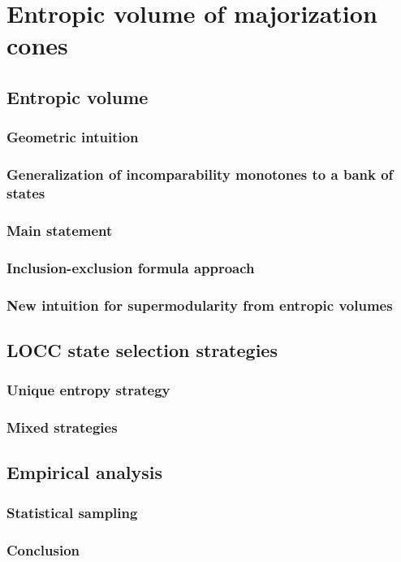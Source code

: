 \chapter{Entropic volume of majorization cones} \label{chap:volume}

\section{Entropic volume}

\subsection{Geometric intuition}

\subsection{Generalization of incomparability monotones to a bank of states}

\subsection{Main statement}

\subsection{Inclusion-exclusion formula approach}

\subsection{New intuition for supermodularity from entropic volumes}

\section{LOCC state selection strategies} \label{sec:strategies}

\subsection{Unique entropy strategy}

\subsection{Mixed strategies}

\section{Empirical analysis}

\subsection{Statistical sampling}

\subsection{Conclusion}